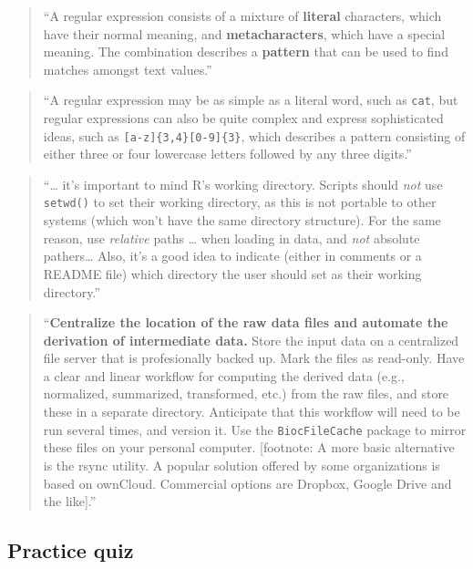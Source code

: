 \documentclass[]{tufte-book}
\begin{document}
\begin{quote}
``A regular expression consists of a mixture of \textbf{literal} characters, which have their
normal meaning, and \textbf{metacharacters}, which have a special meaning. The combination
describes a \textbf{pattern} that can be used to find matches amongst text values.'' \citep{murrell2009introduction}
\end{quote}

\begin{quote}
``A regular expression may be as simple as a literal word, such as \texttt{cat}, but regular
expressions can also be quite complex and express sophisticated ideas, such as
\texttt{{[}a-z{]}\{3,4\}{[}0-9{]}\{3\}}, which describes a pattern consisting of either three or four
lowercase letters followed by any three digits.'' \citep{murrell2009introduction}
\end{quote}

\begin{quote}
``\ldots{} it's important to mind R's working directory. Scripts should \emph{not} use
\texttt{setwd()} to set their working directory, as this is not portable to other
systems (which won't have the same directory structure). For the same reason,
use \emph{relative} paths \ldots{} when loading in data, and \emph{not} absolute pathers\ldots{}
Also, it's a good idea to indicate (either in comments or a README file)
which directory the user should set as their working directory.'' \citep{buffalo2015bioinformatics}
\end{quote}

\begin{quote}
``\textbf{Centralize the location of the raw data files and automate the derivation of
intermediate data.} Store the input data on a centralized file server that is
profesionally backed up. Mark the files as read-only. Have a clear and linear
workflow for computing the derived data (e.g., normalized, summarized, transformed,
etc.) from the raw files, and store these in a separate directory. Anticipate that
this workflow will need to be run several times, and version it. Use the
\texttt{BiocFileCache} package to mirror these files on your personal computer.
{[}footnote: A more basic alternative is the rsync utility. A popular solution offered
by some organizations is based on ownCloud. Commercial options are Dropbox,
Google Drive and the like{]}.'' \citep{holmes2018modern}
\end{quote}

\hypertarget{practice-quiz-1}{%
\subsection{Practice quiz}\label{practice-quiz-1}}
\end{document}
